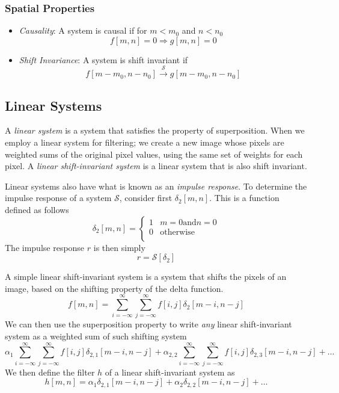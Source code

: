\documentclass{article}
\begin{document}
\subsubsection*{Spatial Properties}

\begin{itemize}
	\item \emph{Causality}: A system is causal if for $m < m_0$ and $n < n_0$
    \[
    	f[m, n] = 0 \Longrightarrow g[m, n] = 0
    \]

    \item \emph{Shift Invariance}: A system is shift invariant if
    \[
    	f[m - m_0, n - n_0] \xrightarrow{\mathcal{S}} g[m - m_0, n - n_0]
    \]
\end{itemize}

\subsection{Linear Systems}

A \emph{linear system} is a system that satisfies the property of superposition. When we employ a linear system for filtering; we create a new image whose pixels are weighted sums of the original pixel values, using the same set of weights for each pixel. A \emph{linear shift-invariant system} is a linear system that is also shift invariant.

Linear systems also have what is known as an \emph{impulse response}. To determine the impulse response of a system $\mathcal{S}$, consider first $\delta_2[m, n]$. This is a function defined as follows
\[
	\delta_2[m, n] = \begin{cases} 1 & m = 0 \text{and} n = 0 \\
    0 & \text{otherwise} \\
    \end{cases}
\]
The impulse response $r$ is then simply
\[
	r = \mathcal{S}[\delta_2]
\]

A simple linear shift-invariant system is a system that shifts the pixels of an image, based on the shifting property of the delta function.
\[
	f[m, n] = \sum\limits_{i = -\infty}^{\infty}\sum\limits_{j = -\infty}^{\infty} f[i, j] \delta_2[m - i, n - j]
\]
We can then use the superposition property to write \emph{any} linear shift-invariant system as a weighted sum of such shifting system
\[
	\alpha_1\sum\limits_{i = -\infty}^{\infty}\sum\limits_{j = -\infty}^{\infty} f[i, j] \delta_{2,1}[m - i, n - j] + \alpha_{2,2}\sum\limits_{i = -\infty}^{\infty}\sum\limits_{j = -\infty}^{\infty} f[i, j] \delta_{2,3}[m - i, n - j] + \dots
\]
We then define the filter $h$ of a linear shift-invariant system as
\[
	h[m, n] = \alpha_1\delta_{2,1}[m - i, n - j] + \alpha_2\delta_{2,2}[m - i, n - j] + \dots
\]
\end{document}
